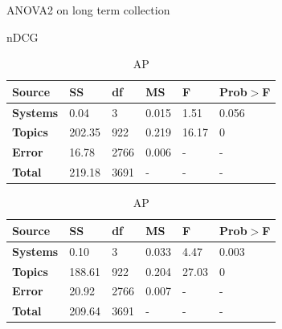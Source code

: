 \begin{table}[tbp]
     \caption{ANOVA2 on long term collection}
    \begin{subtable}[h]{1\textwidth}
        \centering
	\caption{\ac{nDCG}}
        \begin{tabular}{|l|l|l|l|l|l|}
	\toprule
        \textbf{Source} & \textbf{SS} & \textbf{df} & \textbf{MS} & \textbf{F} & \textbf{Prob$>$F} \\
        \midrule
	\textbf{Systems} & 0.04 & 3   & 0.015  & 1.51  & 0.056 \\
	\textbf{Topics}    & 202.35  & 922  & 0.219 & 16.17 & 0 \\
	\textbf{Error}   & 16.78  & 2766 & 0.006 & - & - \\
	\textbf{Total}   & 219.18  & 3691 & - & - & - \\
	\bottomrule
       \end{tabular}
    \end{subtable}
        \begin{subtable}[h]{1\textwidth}
        \centering
	\caption{\ac{AP}}
        \begin{tabular}{|l|l|l|l|l|l|}
	\toprule
        \textbf{Source} & \textbf{SS} & \textbf{df} & \textbf{MS} & \textbf{F} & \textbf{Prob$>$F} \\
        \midrule
	\textbf{Systems} & 0.10 & 3   & 0.033  & 4.47  & 0.003 \\
	\textbf{Topics}    & 188.61  & 922  & 0.204 & 27.03 & 0 \\
	\textbf{Error}   & 20.92  & 2766 & 0.007 & - & - \\
	\textbf{Total}   & 209.64  & 3691 & - & - & - \\
	\bottomrule
       \end{tabular}
    \end{subtable}
     \label{tab:long-anova2}
\end{table}

